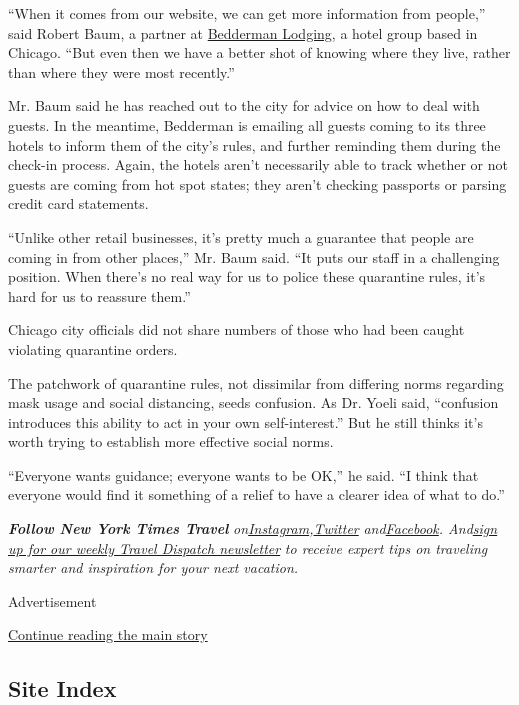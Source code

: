 ``When it comes from our website, we can get more information from
people,'' said Robert Baum, a partner at
\href{https://staybedderman.com/}{Bedderman Lodging}, a hotel group
based in Chicago. ``But even then we have a better shot of knowing where
they live, rather than where they were most recently.''

Mr. Baum said he has reached out to the city for advice on how to deal
with guests. In the meantime, Bedderman is emailing all guests coming to
its three hotels to inform them of the city's rules, and further
reminding them during the check-in process. Again, the hotels aren't
necessarily able to track whether or not guests are coming from hot spot
states; they aren't checking passports or parsing credit card
statements.

``Unlike other retail businesses, it's pretty much a guarantee that
people are coming in from other places,'' Mr. Baum said. ``It puts our
staff in a challenging position. When there's no real way for us to
police these quarantine rules, it's hard for us to reassure them.''

Chicago city officials did not share numbers of those who had been
caught violating quarantine orders.

The patchwork of quarantine rules, not dissimilar from differing norms
regarding mask usage and social distancing, seeds confusion. As Dr.
Yoeli said, ``confusion introduces this ability to act in your own
self-interest.'' But he still thinks it's worth trying to establish more
effective social norms.

``Everyone wants guidance; everyone wants to be OK,'' he said. ``I think
that everyone would find it something of a relief to have a clearer idea
of what to do.''

\emph{\textbf{Follow New York Times Travel}}
\emph{on}\href{https://www.instagram.com/nytimestravel/}{\emph{Instagram}}\emph{,}\href{https://twitter.com/nytimestravel}{\emph{Twitter}}
\emph{and}\href{https://www.facebookcorewwwi.onion/nytimestravel/}{\emph{Facebook}}\emph{.
And}\href{https://www.nytimes3xbfgragh.onion/newsletters/traveldispatch}{\emph{sign
up for our weekly Travel Dispatch newsletter}} \emph{to receive expert
tips on traveling smarter and inspiration for your next vacation.}

Advertisement

\protect\hyperlink{after-bottom}{Continue reading the main story}

\hypertarget{site-index}{%
\subsection{Site Index}\label{site-index}}

